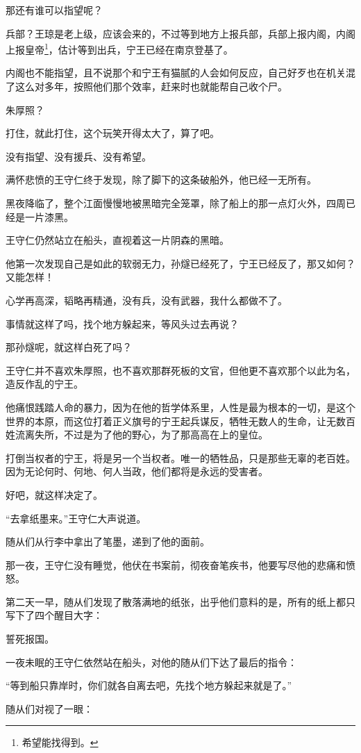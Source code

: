 \begin{multicols}{\theparacolNo}
那还有谁可以指望呢？

兵部？王琼是老上级，应该会来的，不过等到地方上报兵部，兵部上报内阁，内阁上报皇帝\footnote{希望能找得到。}，估计等到出兵，宁王已经在南京登基了。

内阁也不能指望，且不说那个和宁王有猫腻的人会如何反应，自己好歹也在机关混了这么对多年，按照他们那个效率，赶来时也就能帮自己收个尸。

朱厚照？

打住，就此打住，这个玩笑开得太大了，算了吧。

没有指望、没有援兵、没有希望。

满怀悲愤的王守仁终于发现，除了脚下的这条破船外，他已经一无所有。

黑夜降临了，整个江面慢慢地被黑暗完全笼罩，除了船上的那一点灯火外，四周已经是一片漆黑。

王守仁仍然站立在船头，直视着这一片阴森的黑暗。

他第一次发现自己是如此的软弱无力，孙燧已经死了，宁王已经反了，那又如何？又能怎样！

心学再高深，韬略再精通，没有兵，没有武器，我什么都做不了。

事情就这样了吗，找个地方躲起来，等风头过去再说？

那孙燧呢，就这样白死了吗？

王守仁并不喜欢朱厚照，也不喜欢那群死板的文官，但他更不喜欢那个以此为名，造反作乱的宁王。

他痛恨践踏人命的暴力，因为在他的哲学体系里，人性是最为根本的一切，是这个世界的本原，而这位打着正义旗号的宁王起兵谋反，牺牲无数人的生命，让无数百姓流离失所，不过是为了他的野心，为了那高高在上的皇位。

打倒当权者的宁王，将是另一个当权者。唯一的牺牲品，只是那些无辜的老百姓。因为无论何时、何地、何人当政，他们都将是永远的受害者。

好吧，就这样决定了。

“去拿纸墨来。”王守仁大声说道。

随从们从行李中拿出了笔墨，递到了他的面前。

那一夜，王守仁没有睡觉，他伏在书案前，彻夜奋笔疾书，他要写尽他的悲痛和愤怒。

第二天一早，随从们发现了散落满地的纸张，出乎他们意料的是，所有的纸上都只写下了四个醒目大字：

誓死报国。

一夜未眠的王守仁依然站在船头，对他的随从们下达了最后的指令：

“等到船只靠岸时，你们就各自离去吧，先找个地方躲起来就是了。”

随从们对视了一眼：


\end{multicols}
